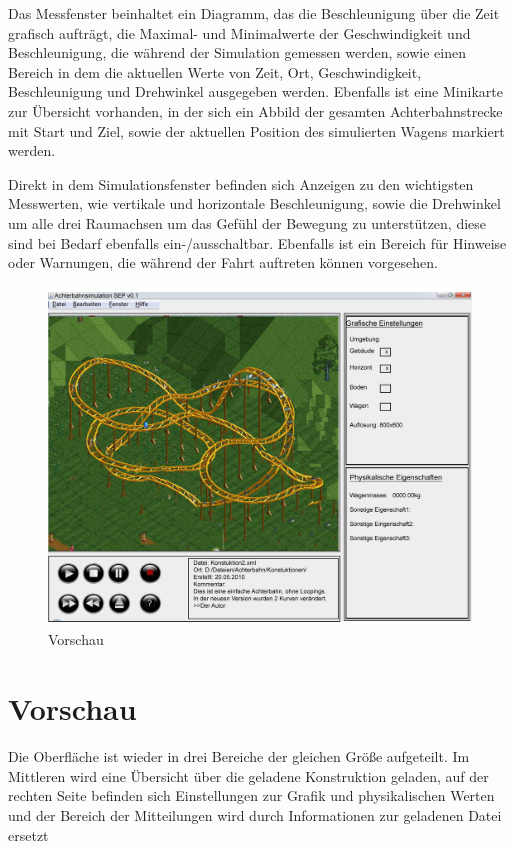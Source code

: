 Das Messfenster beinhaltet ein Diagramm, das die Beschleunigung über die Zeit grafisch aufträgt, die Maximal- und Minimalwerte der Geschwindigkeit und Beschleunigung, die während der Simulation gemessen werden, sowie einen Bereich in dem die aktuellen Werte von Zeit, Ort, Geschwindigkeit, Beschleunigung und Drehwinkel ausgegeben werden.
Ebenfalls ist eine Minikarte zur Übersicht vorhanden, in der sich ein Abbild der gesamten Achterbahnstrecke mit Start und Ziel, sowie der aktuellen Position des simulierten Wagens markiert werden.

Direkt in dem Simulationsfenster befinden sich Anzeigen zu den wichtigsten Messwerten, wie vertikale und horizontale Beschleunigung, sowie die Drehwinkel um alle drei Raumachsen um das Gefühl der Bewegung zu unterstützen, diese sind bei Bedarf ebenfalls ein-/ausschaltbar. Ebenfalls ist ein Bereich für Hinweise oder Warnungen, die während der Fahrt auftreten können vorgesehen. 

\begin{figure}[!h]%
\includegraphics[width=0.8\linewidth]{./bilder/GUI_v3.jpg}%
\caption{Vorschau}%
\label{Vorschau}%
\end{figure}

\section*{Vorschau}
Die Oberfläche ist wieder in drei Bereiche der gleichen Größe aufgeteilt. Im Mittleren wird eine Übersicht über die geladene Konstruktion geladen, auf der rechten Seite befinden sich Einstellungen zur Grafik und physikalischen Werten und der Bereich der Mitteilungen wird durch Informationen zur geladenen Datei ersetzt

